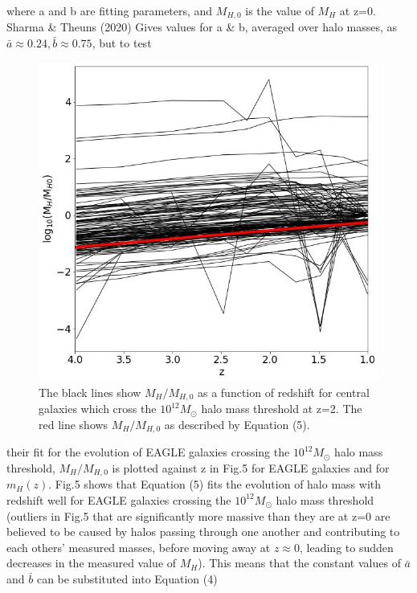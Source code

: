 \documentclass[12pt, twocolumn]{revtex4}    %
\begin{document}
\noindent where a and b are fitting parameters, and $M_{H,0}$ is the value of $M_H$ at z=0. Sharma \& Theuns (2020) Gives values for a \& b, averaged over halo masses, as $\bar a \approx 0.24, \bar b \approx 0.75$, but to test

\onecolumngrid


\begin{figure}[H]
\centering
\includegraphics[width=\linewidth]{Plot_5.jpeg}
\caption{The black lines show $M_H/M_{H,0}$ as a function of redshift for central galaxies which cross the $10^{12}M_\odot$ halo mass threshold at z=2. The red line shows $M_H/M_{H,0}$ as described by Equation (5).}
\label{fig:5}
\end{figure}
\twocolumngrid


\noindent their fit for the evolution of EAGLE galaxies crossing the $10^{12}M_\odot$ halo mass threshold, $M_H/M_{H,0}$ is plotted against z in Fig.5 for EAGLE galaxies and for $m_H(z)$. Fig.5 shows that Equation (5) fits the evolution of halo mass with redshift well for EAGLE galaxies crossing the $10^{12}M_\odot$ halo mass threshold (outliers in Fig.5 that are significantly more massive than they are at z=0 are believed to be caused by halos passing through one another and contributing to each others' measured masses, before moving away at $z\approx0$, leading to  sudden decreases in the measured value of $M_H$). This means that the constant values of $\bar a$ and $\bar b$ can be substituted into Equation (4)
\end{document}
